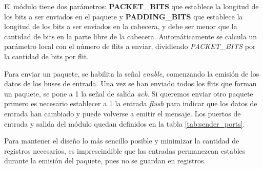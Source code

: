 El módulo tiene dos parámetros: \textbf{PACKET\_BITS} que establece la longitud de los bits a ser enviados en el paquete y \textbf{PADDING\_BITS} que establece la longitud de los bits a ser enviados en la cabecera, y debe ser menor que la cantidad de bits en la parte libre de la cabecera. Automáticamente se calcula un parámetro local con el número de flits a enviar, dividiendo \textit{PACKET\_BITS} por la cantidad de bits por flit.

Para enviar un paquete, se habilita la señal \textit{enable}, comenzando la emisión de los datos de los buses de entrada. Una vez se han enviado todos los flits que forman un paquete, se pone a 1 la señal de salida \textit{ack}. Si queremos enviar otro paquete primero es necesario establecer a 1 la entrada \textit{flush} para indicar que los datos de entrada han cambiado y puede volverse a emitir el mensaje. Los puertos de entrada y salida del módulo quedan definidos en la tabla \ref{tab:sender_ports}.

Para mantener el diseño lo más sencillo posible y minimizar la cantidad de registros necesarios, es imprescindible que las entradas permanezcan estables durante la emisión del paquete, pues no se guardan en registros.

